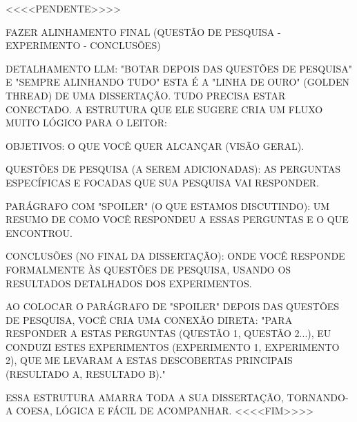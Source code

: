 
    <<<<PENDENTE>>>>

    FAZER ALINHAMENTO FINAL (QUESTÃO DE PESQUISA - EXPERIMENTO - CONCLUSÕES)
    
    DETALHAMENTO LLM: "BOTAR DEPOIS DAS QUESTÕES DE PESQUISA" E "SEMPRE ALINHANDO TUDO"
    ESTA É A "LINHA DE OURO" (GOLDEN THREAD) DE UMA DISSERTAÇÃO. TUDO PRECISA ESTAR CONECTADO. A ESTRUTURA QUE ELE SUGERE CRIA UM FLUXO MUITO LÓGICO PARA O LEITOR:
    
    OBJETIVOS: O QUE VOCÊ QUER ALCANÇAR (VISÃO GERAL).
    
    QUESTÕES DE PESQUISA (A SEREM ADICIONADAS): AS PERGUNTAS ESPECÍFICAS E FOCADAS QUE SUA PESQUISA VAI RESPONDER.
    
    PARÁGRAFO COM "SPOILER" (O QUE ESTAMOS DISCUTINDO): UM RESUMO DE COMO VOCÊ RESPONDEU A ESSAS PERGUNTAS E O QUE ENCONTROU.
    
    CONCLUSÕES (NO FINAL DA DISSERTAÇÃO): ONDE VOCÊ RESPONDE FORMALMENTE ÀS QUESTÕES DE PESQUISA, USANDO OS RESULTADOS DETALHADOS DOS EXPERIMENTOS.

    AO COLOCAR O PARÁGRAFO DE "SPOILER" DEPOIS DAS QUESTÕES DE PESQUISA, VOCÊ CRIA UMA CONEXÃO DIRETA: "PARA RESPONDER A ESTAS PERGUNTAS (QUESTÃO 1, QUESTÃO 2...), EU CONDUZI ESTES EXPERIMENTOS (EXPERIMENTO 1, EXPERIMENTO 2), QUE ME LEVARAM A ESTAS DESCOBERTAS PRINCIPAIS (RESULTADO A, RESULTADO B)."

    ESSA ESTRUTURA AMARRA TODA A SUA DISSERTAÇÃO, TORNANDO-A COESA, LÓGICA E FÁCIL DE ACOMPANHAR.
    <<<<FIM>>>>



